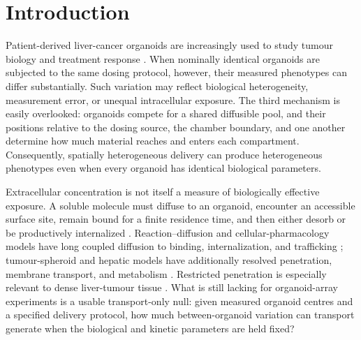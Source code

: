 \documentclass[pdflatex,sn-mathphys-num]{sn-jnl}
\numberwithin{equation}{section}
\theoremstyle{thmstyleone}%
\theoremstyle{definition}
\theoremstyle{remark}
\begin{document}

\maketitle

\section{Introduction}
\label{sec:introduction}

Patient-derived liver-cancer organoids are increasingly used to study tumour biology and treatment response \cite{broutier2017human,artegiani2019probing,wang2025analysis,sun2019modelling,tang2022human,drost2017translational,zhao2022organoids,fatehullah2016organoids,hofer2021engineering}. When nominally identical organoids are subjected to the same dosing protocol, however, their measured phenotypes can differ substantially. Such variation may reflect biological heterogeneity, measurement error, or unequal intracellular exposure. The third mechanism is easily overlooked: organoids compete for a shared diffusible pool, and their positions relative to the dosing source, the chamber boundary, and one another determine how much material reaches and enters each compartment. Consequently, spatially heterogeneous delivery can produce heterogeneous phenotypes even when every organoid has identical biological parameters.

Extracellular concentration is not itself a measure of biologically effective exposure. A soluble molecule must diffuse to an organoid, encounter an accessible surface site, remain bound for a finite residence time, and then either desorb or be productively internalized \cite{lauffenburger1996receptors,wang2025analysis1}. Reaction--diffusion and cellular-pharmacology models have long coupled diffusion to binding, internalization, and trafficking \cite{rippley1995effects,liang2025global,wenning1999coupled}; tumour-spheroid and hepatic models have additionally resolved penetration, membrane transport, and metabolism \cite{goodman2008spatiotemporal,gao2013predictive,wang2026algebraic,leedale2020multiscale}. Restricted penetration is especially relevant to dense liver-tumour tissue \cite{hernandez2013role,jain2014role,wang2026damage,minchinton2006drug}. What is still lacking for organoid-array experiments is a usable transport-only null: given measured organoid centres and a specified delivery protocol, how much between-organoid variation can transport generate when the biological and kinetic parameters are held fixed?
\end{document}
